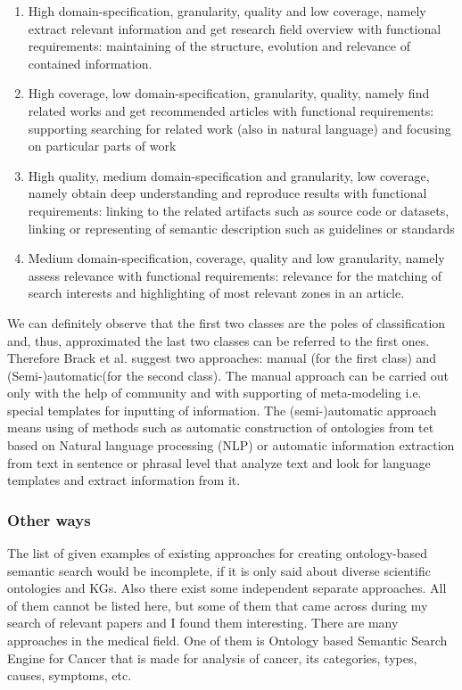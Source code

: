			\begin{enumerate}
				\item High domain-specification, granularity, quality and low coverage, namely extract relevant information and get research field overview with functional requirements: maintaining of the structure, evolution and relevance of contained information.  
				\item High coverage, low domain-specification, granularity, quality, namely find related works and get recommended articles with functional requirements: supporting searching for related work (also in natural language) and focusing on particular parts of work 
				\item High quality, medium domain-specification and granularity, low coverage, namely obtain deep understanding and reproduce results with functional requirements: linking to the related artifacts such as source code or datasets, linking or representing of semantic description such as guidelines or standards
				\item Medium domain-specification, coverage, quality and low granularity, namely assess relevance with functional requirements: relevance for the matching of search interests and highlighting of most relevant zones in an article. 
			\end{enumerate} 
		We can definitely observe that the first two classes are the poles of classification and, thus, approximated the last two classes can be referred to the first ones. Therefore Brack et al. \cite{Bra20} suggest two approaches: manual (for the first class) and (Semi-)automatic(for the second class). The manual approach can be carried out only with the help of community and with supporting of meta-modeling i.e. special templates for inputting of information. The (semi-)automatic approach means using of methods such as automatic construction of ontologies from tet based on Natural language processing (NLP) or automatic information extraction from text in sentence or phrasal level that analyze text and look for language templates and extract information from it.
		
		\subsubsection{Other ways}
		The list of given examples of existing approaches for creating ontology-based semantic search would be incomplete, if it is only said about diverse scientific ontologies and KGs. Also there exist some independent separate approaches. All of them cannot be listed here, but some of them that came across during my search of relevant papers and I found them interesting. 
		There are many approaches in the medical field. One of them is Ontology based Semantic Search Engine for Cancer\cite{Raj14} that is made for analysis of cancer, its categories, types, causes, symptoms, etc. 
		
